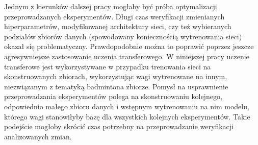 Jednym z kierunków dalszej pracy mogłaby być próba optymalizacji przeprowadzanych eksperymentów. Długi czas weryfikacji zmienianych hiperparametrów, modyfikowanej architektury sieci, czy też wybieranych podziałów zbiorów danych (spowodowany koniecznością wytrenowania sieci) okazał się problematyczny. Prawdopodobnie można to poprawić poprzez jeszcze agresywniejsze zastosowanie uczenia transferowego. W niniejszej pracy uczenie transferowe jest wykorzystywane w przypadku trenowania sieci na skonstruowanych zbiorach, wykorzystując wagi wytrenowane na innym, niezwiązanym z tematyką badmintona zbiorze. Pomysł na usprawnienie przeprowadzania eksperymentów polega na skonstruowaniu kolejnego, odpowiednio małego zbioru danych i wstępnym wytrenowaniu na nim modelu, którego wagi stanowiłyby bazę dla wszystkich kolejnych eksperymentów. Takie podejście mogłoby skrócić czas potrzebny na przeprowadzanie weryfikacji analizowanych zmian.
